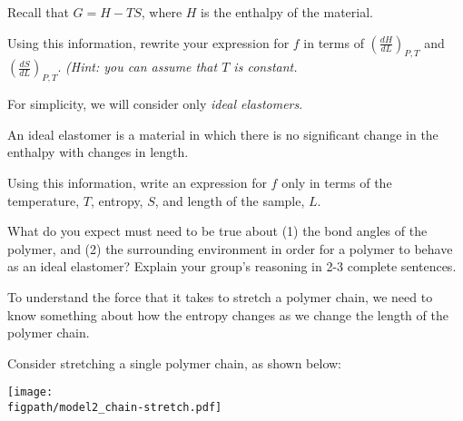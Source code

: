 \begin{activity}
\begin{ctqs}
	\question Recall that $G = H - TS$, where $H$ is the enthalpy of the material.  
	
		Using this information, rewrite your expression for $f$ in terms of $\left(\frac{dH}{dL}\right)_{P,T}$ and $\left(\frac{dS}{dL}\right)_{P,T}$.  \emph{(Hint: you can assume that $T$ is constant.}
		
		\begin{solution}[1.5in]
		\end{solution}
		
		\label{\labelbase:ctq:fdSdL}
	
\end{ctqs}

\begin{infobox}
	
	For simplicity, we will consider only \emph{ideal elastomers}.
	
	An ideal elastomer is a material in which there is no significant change in the enthalpy with changes in length.
	
\end{infobox}

\begin{ctqs}

	\question Using this information, write an expression for $f$ only in terms of the temperature, $T$, entropy, $S$, and length of the sample, $L$.
		
		\begin{solution}[1in]
		\end{solution}
	
	\question What do you expect must need to be true about (1) the bond angles of the polymer, and (2) the surrounding environment in order for a polymer to behave as an ideal elastomer?  Explain your group's reasoning in 2-3 complete sentences.
		
		\begin{solution}[2in]
		\end{solution}

\end{ctqs}

\begin{model}
	To understand the force that it takes to stretch a polymer chain, we need to know something about how the entropy changes as we change the length of the polymer chain.
	
	Consider stretching a single polymer chain, as shown below:
	
	\vspace{6pt}
	\centerline{\texttt{[image: \\figpath/model2\_chain-stretch.pdf]}}
\end{model}


\end{activity}
